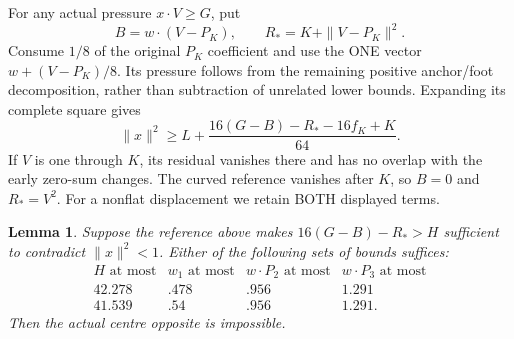 \documentclass[11pt]{article}
\newtheorem{lemma}[theorem]{Lemma}
\theoremstyle{definition}
\theoremstyle{remark}
\begin{document}
For any actual pressure \(x\cdot V\ge G\), put
\[
 B=w\cdot(V-P_K),\qquad R_*=K+\|V-P_K\|^2 .
\]
Consume \(1/8\) of the original \(P_K\) coefficient and use the ONE
vector \(w+(V-P_K)/8\). Its pressure follows from the remaining positive
anchor/foot decomposition, rather than subtraction of unrelated lower
bounds. Expanding its complete square gives
\[
 \|x\|^2\ge
 L+\frac{16(G-B)-R_*-16f_K+K}{64}.
\tag{D19generalpay}\label{app:exact19:eq:Dgeneralpay}
\]
If \(V\) is one through \(K\), its residual vanishes there and has no
overlap with the early zero-sum changes. The curved reference vanishes
after \(K\), so \(B=0\) and \(R_*=V^2\).
For a nonflat displacement we retain BOTH displayed terms.

\begin{lemma}\label{app:exact19:lem:Dcentretest}
Suppose the reference above makes \(16(G-B)-R_*>H\) sufficient to
contradict \(\|x\|^2<1\).
Either of the following sets of bounds suffices:
\[
\begin{array}{c|c|c|c}
 H\text{ at most}&w_1\text{ at most}&w\cdot P_2\text{ at most}
                                      &w\cdot P_3\text{ at most}\\ \hline
 42.278&.478&.956&1.291\\
 41.539&.54&.956&1.291 .
\end{array}
\]
Then the actual centre opposite is impossible.
\end{lemma}
\end{document}
